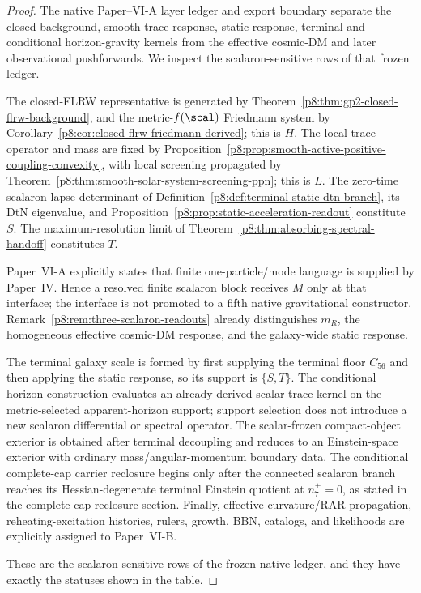 \documentclass[12pt,a4paper]{article}
\begin{document}
\begin{proof}
The native Paper--VI-A layer ledger and export boundary separate the closed
background, smooth trace-response, static-response, terminal and conditional
horizon-gravity kernels from the effective cosmic-DM and later observational
pushforwards.  We inspect the scalaron-sensitive rows of that frozen ledger.

The closed-FLRW representative is generated by
Theorem~\ref{p8:thm:gp2-closed-flrw-background}, and the metric-$f(\scal)$
Friedmann system by Corollary~\ref{p8:cor:closed-flrw-friedmann-derived}; this is
$H$.  The local trace operator and mass are fixed by
Proposition~\ref{p8:prop:smooth-active-positive-coupling-convexity}, with local
screening propagated by
Theorem~\ref{p8:thm:smooth-solar-system-screening-ppn}; this is $L$.  The
zero-time scalaron-lapse determinant of
Definition~\ref{p8:def:terminal-static-dtn-branch}, its DtN eigenvalue, and
Proposition~\ref{p8:prop:static-acceleration-readout} constitute $S$.  The
maximum-resolution limit of
Theorem~\ref{p8:thm:absorbing-spectral-handoff} constitutes $T$.

Paper~VI-A explicitly states that finite one-particle/mode language is supplied
by Paper~IV.  Hence a resolved finite scalaron block receives $M$ only at that
interface; the interface is not promoted to a fifth native gravitational
constructor.  Remark~\ref{p8:rem:three-scalaron-readouts} already distinguishes
$m_R$, the homogeneous effective cosmic-DM response, and the galaxy-wide
static response.

The terminal galaxy scale is formed by first supplying the terminal floor
$C_{56}$ and then applying the static response, so its support is $\{S,T\}$.
The conditional horizon construction evaluates an already derived scalar trace
kernel on the metric-selected apparent-horizon support; support selection does
not introduce a new scalaron differential or spectral operator.  The
scalar-frozen compact-object exterior is obtained after terminal decoupling and
reduces to an Einstein-space exterior with ordinary mass/angular-momentum
boundary data.  The conditional complete-cap carrier reclosure begins only
after the connected scalaron branch reaches its Hessian-degenerate terminal
Einstein quotient at \(n_7^+=0\), as stated in the complete-cap reclosure
section.  Finally, effective-curvature/RAR
propagation, reheating-excitation histories, rulers, growth, BBN, catalogs,
and likelihoods are explicitly assigned to Paper~VI-B.

These are the scalaron-sensitive rows of the frozen native ledger, and they
have exactly the statuses shown in the table. \qedhere
\end{proof}
\end{document}
